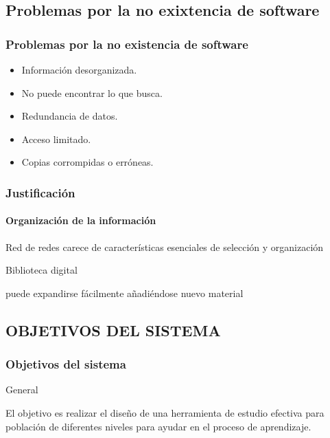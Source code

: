 \documentclass[article]{beamer}
\begin{document}

\subsection{Problemas por la no exixtencia de software}
\begin{frame}[fragile]
\frametitle{Problemas por la no existencia de software}
\begin{itemize}
\item Información desorganizada.
\item No puede encontrar lo que busca.
\item Redundancia de datos.
\item Acceso limitado.
\item Copias corrompidas o erróneas.
\end{itemize}
\end{frame}





\begin{frame}[fragile]
\frametitle{Justificación}
\framesubtitle{Organización de la información}

Red de redes carece de características esenciales de selección y organización\\
\begin{block}{Biblioteca digital}
{
\begin{center}
puede expandirse fácilmente añadiéndose  nuevo material
\end{center}
} \vspace{-0.5cm}
\end{block}
\end{frame}

\subsection{OBJETIVOS DEL SISTEMA}

\begin{frame}
\frametitle{Objetivos del sistema}
\begin{block}{General}
{
\begin{center}
El objetivo es realizar el diseño de una herramienta de estudio efectiva para población de diferentes niveles para
ayudar en el proceso de aprendizaje.
\end{center}
} \vspace{-0.5cm}
\end{block}
\end{frame}
\end{document}
